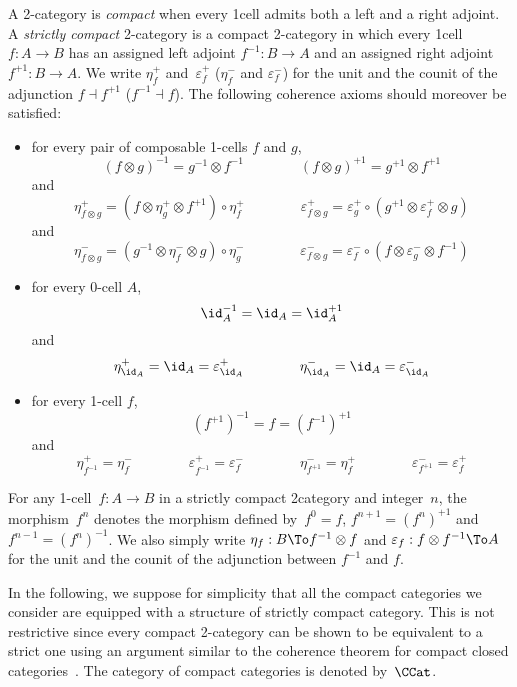 \documentclass{LMCS}
\newenvironment{definition}{\begin{defi}}{\end{defi}}
\begin{document}
\begin{definition}
  A 2-category is \emph{compact} when every 1\nbd cell admits both a left and a
  right adjoint.
A \emph{strictly compact} 2-category is a compact 2-category in which every
  1\nbd cell \hbox{$f:A\to B$} has an assigned left adjoint \hbox{$f^{-1}:B\to
    A$} and an assigned right adjoint \hbox{$f^{+1}:B\to A$}. We write
  $\eta_f^{+}$ and~$\varepsilon_f^{+}$ (\resp $\eta_f^{-}$ and
  $\varepsilon_f^{-}$) for the unit and the counit of the adjunction $f\dashv
  f^{+1}$ (\resp $f^{-1}\dashv f$). The following coherence axioms should
  moreover be satisfied:
  \begin{itemize}
  \item for every pair of composable 1-cells $f$ and $g$,
    \[
    (f\otimes g)^{-1}=g^{-1}\otimes f^{-1}
    \qquad\qquad
    (f\otimes g)^{+1}=g^{+1}\otimes f^{+1}
    \]
    and
    \[
    \eta_{f\otimes g}^+=(f\otimes\eta_g^+\otimes f^{+1})\circ\eta_f^+
    \qquad\qquad
    \varepsilon_{f\otimes g}^+=\varepsilon_g^+\circ(g^{+1}\otimes\varepsilon_f^+\otimes g)
    \]
     and
    \[
    \eta_{f\otimes g}^-=(g^{-1}\otimes\eta_f^-\otimes g)\circ\eta_g^-
    \qquad\qquad
    \varepsilon_{f\otimes g}^-=\varepsilon_f^-\circ(f\otimes\varepsilon_g^-\otimes f^{-1})
    \]
  \item for every 0-cell $A$,
    \[
    \id_A^{-1}=\id_A=\id_A^{+1}
    \]
    and
    \[
    \eta_{\id_A}^+=\id_A=\varepsilon_{\id_A}^+
    \qquad\qquad
    \eta_{\id_A}^-=\id_A=\varepsilon_{\id_A}^-
    \]
  \item for every 1-cell $f$,
    \[
    (f^{+1})^{-1}=f=(f^{-1})^{+1}
    \]
    and
    \[
    \eta_{f^{-1}}^+=\eta_f^-
    \qquad\qquad
    \varepsilon_{f^{-1}}^+=\varepsilon_f^-
    \qquad\qquad
    \eta_{f^{+1}}^-=\eta_f^+
    \qquad\qquad
    \varepsilon_{f^{+1}}^-=\varepsilon_f^+
    \]
  \end{itemize}

  For any 1-cell~$f:A\to B$ in a strictly compact 2\nbd{}category and
  integer~$n$, the morphism~$f^n$ denotes the morphism defined by~$f^0=f$,
  $f^{n+1}=(f^n)^{+1}$ and~$f^{n-1}=(f^n)^{-1}$. We also simply write
  $\eta_f:B\To f^{-1}\otimes f$ and \hbox{$\varepsilon_f:f\otimes f^{-1}\To A$}
  for the unit and the counit of the adjunction between $f^{-1}$ and $f$.
\end{definition}

In the following, we suppose for simplicity that all the compact categories we
consider are equipped with a structure of strictly compact category. This is not
restrictive since every compact 2-category can be shown to be equivalent to a
strict one using an argument similar to the coherence theorem for compact closed
categories~\cite{kelly-laplaza:coherence-compact-closed}. The category of
compact categories is denoted by~$\CCat$.
\end{document}
